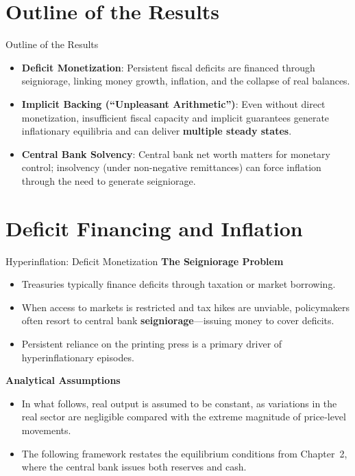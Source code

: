 \documentclass[11pt,aspectratio=169]{beamer}
\begin{document}
\section{Outline of the Results}

\begin{frame}{Outline of the Results}
\small
\begin{itemize}
    \item \textbf{Deficit Monetization}: Persistent fiscal deficits are financed through seigniorage, linking money growth, inflation, and the collapse of real balances.

    \vspace{0.3em}
    \item \textbf{Implicit Backing (\enquote{Unpleasant Arithmetic})}: Even without direct monetization, insufficient fiscal capacity and implicit guarantees generate inflationary equilibria and can deliver \textbf{multiple steady states}.

    \vspace{0.3em}
    \item \textbf{Central Bank Solvency}: Central bank net worth matters for monetary control; insolvency (under non-negative remittances) can force inflation through the need to generate seigniorage.
\end{itemize}
\end{frame}


\section{Deficit Financing and Inflation}

\begin{frame}{Hyperinflation: Deficit Monetization}
\small
\textbf{The Seigniorage Problem}
\begin{itemize}
    \item Treasuries typically finance deficits through taxation or market borrowing.
    \item When access to markets is restricted and tax hikes are unviable, policymakers often resort to central bank \textbf{seigniorage}—issuing money to cover deficits.
    \item Persistent reliance on the printing press is a primary driver of hyperinflationary episodes.
\end{itemize}

\vspace{0.3cm}

\textbf{Analytical Assumptions}
\begin{itemize}
    \item In what follows, real output is assumed to be constant, as variations in the real sector are negligible compared with the extreme magnitude of price‑level movements.
    \item The following framework restates the equilibrium conditions from Chapter 2, where the central bank issues both reserves and cash.
\end{itemize}
\end{frame}
\end{document}
